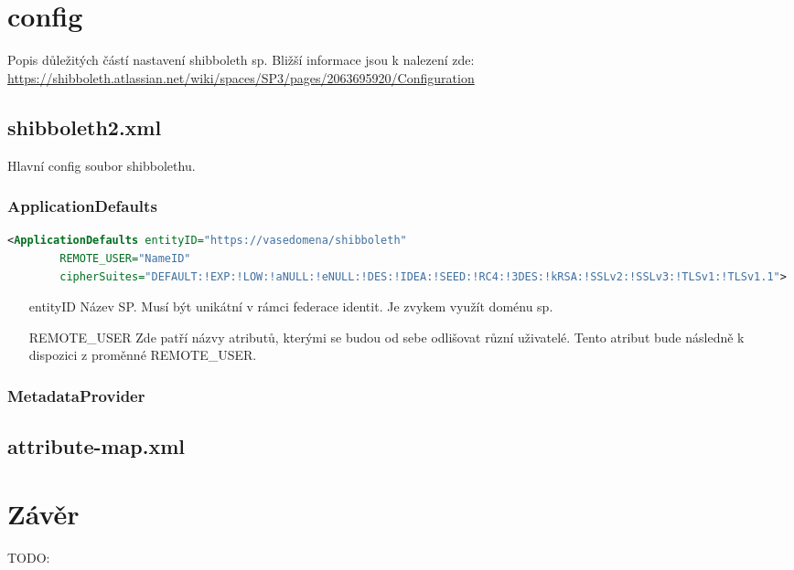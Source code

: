 \chapter{config}
Popis důležitých částí nastavení shibboleth sp. Bližší informace jsou k nalezení zde: \url{https://shibboleth.atlassian.net/wiki/spaces/SP3/pages/2063695920/Configuration}

\section{shibboleth2.xml}
Hlavní config soubor shibbolethu. 

\subsection{ApplicationDefaults}
\begin{lstlisting}[language=xml]
<ApplicationDefaults entityID="https://vasedomena/shibboleth"
        REMOTE_USER="NameID"
        cipherSuites="DEFAULT:!EXP:!LOW:!aNULL:!eNULL:!DES:!IDEA:!SEED:!RC4:!3DES:!kRSA:!SSLv2:!SSLv3:!TLSv1:!TLSv1.1">
\end{lstlisting}
\begin{itemize}
    \item[entityID]
    Název SP. Musí být unikátní v rámci federace identit. Je zvykem využít doménu sp.  
    \item[REMOTE\_USER] 
    Zde patří názvy atributů, kterými se budou od sebe odlišovat různí uživatelé. 
    Tento atribut bude následně k dispozici z proměnné REMOTE_USER.
\end{itemize}
\subsection{MetadataProvider}
\section{attribute-map.xml }

\chapter{Závěr}
TODO:
\label{zaver}






